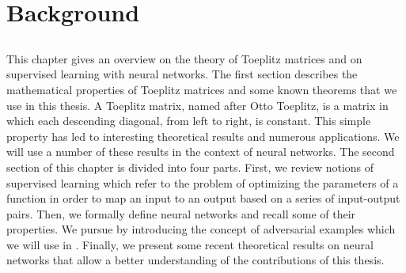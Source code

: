 \chapter{Background}
\label{chapter:ch2-background}
\localtoc

\section*{}

This chapter gives an overview on the theory of Toeplitz matrices and on supervised learning with neural networks.
The first section describes the mathematical properties of Toeplitz matrices and some known theorems that we use in this thesis.
A Toeplitz matrix, named after Otto Toeplitz, is a matrix in which each descending diagonal, from left to right, is constant.
This simple property has led to interesting theoretical results and numerous applications.
We will use a number of these results in the context of neural networks.
The second section of this chapter is divided into four parts.
First, we review notions of supervised learning which refer to the problem of optimizing the parameters of a function in order to map an input to an output based on a series of input-output pairs.
Then, we formally define neural networks and recall some of their properties.
We pursue by introducing the concept of adversarial examples which we will use in .
Finally, we present some recent theoretical results on neural networks that allow a better understanding of the contributions of this thesis.




